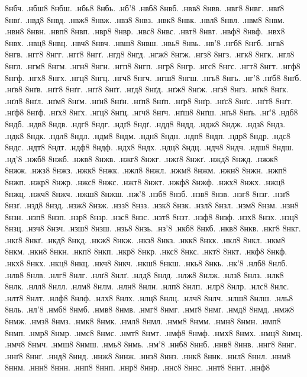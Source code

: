{8нбч.
.нбш8
8нбш.
.нбь8
8нбь.
.нб'8
.нвб8
8нвб.
.нвв8
8нвв.
.нвг8
8нвг.
.нвґ8
8нвґ.
.нвд8
8нвд.
.нвж8
8нвж.
.нвз8
8нвз.
.нвк8
8нвк.
.нвл8
8нвл.
.нвм8
8нвм.
.нвн8
8нвн.
.нвп8
8нвп.
.нвр8
8нвр.
.нвс8
8нвс.
.нвт8
8нвт.
.нвф8
8нвф.
.нвх8
8нвх.
.нвц8
8нвц.
.нвч8
8нвч.
.нвш8
8нвш.
.нвь8
8нвь.
.нв'8
.нгб8
8нгб.
.нгв8
8нгв.
.нгг8
8нгг.
.нгґ8
8нгґ.
.нгд8
8нгд.
.нгж8
8нгж.
.нгз8
8нгз.
.нгк8
8нгк.
.нгл8
8нгл.
.нгм8
8нгм.
.нгн8
8нгн.
.нгп8
8нгп.
.нгр8
8нгр.
.нгс8
8нгс.
.нгт8
8нгт.
.нгф8
8нгф.
.нгх8
8нгх.
.нгц8
8нгц.
.нгч8
8нгч.
.нгш8
8нгш.
.нгь8
8нгь.
.нг'8
.нґб8
8нґб.
.нґв8
8нґв.
.нґг8
8нґг.
.нґґ8
8нґґ.
.нґд8
8нґд.
.нґж8
8нґж.
.нґз8
8нґз.
.нґк8
8нґк.
.нґл8
8нґл.
.нґм8
8нґм.
.нґн8
8нґн.
.нґп8
8нґп.
.нґр8
8нґр.
.нґс8
8нґс.
.нґт8
8нґт.
.нґф8
8нґф.
.нґх8
8нґх.
.нґц8
8нґц.
.нґч8
8нґч.
.нґш8
8нґш.
.нґь8
8нґь.
.нґ'8
.ндб8
8ндб.
.ндв8
8ндв.
.ндг8
8ндг.
.ндґ8
8ндґ.
.ндд8
8ндд.
.ндж8
8ндж.
.ндз8
8ндз.
.ндк8
8ндк.
.ндл8
8ндл.
.ндм8
8ндм.
.ндн8
8ндн.
.ндп8
8ндп.
.ндр8
8ндр.
.ндс8
8ндс.
.ндт8
8ндт.
.ндф8
8ндф.
.ндх8
8ндх.
.ндц8
8ндц.
.ндч8
8ндч.
.ндш8
8ндш.
.нд'8
.нжб8
8нжб.
.нжв8
8нжв.
.нжг8
8нжг.
.нжґ8
8нжґ.
.нжд8
8нжд.
.нжж8
8нжж.
.нжз8
8нжз.
.нжк8
8нжк.
.нжл8
8нжл.
.нжм8
8нжм.
.нжн8
8нжн.
.нжп8
8нжп.
.нжр8
8нжр.
.нжс8
8нжс.
.нжт8
8нжт.
.нжф8
8нжф.
.нжх8
8нжх.
.нжц8
8нжц.
.нжч8
8нжч.
.нжш8
8нжш.
.нж'8
.нзб8
8нзб.
.нзв8
8нзв.
.нзг8
8нзг.
.нзґ8
8нзґ.
.нзд8
8нзд.
.нзж8
8нзж.
.нзз8
8нзз.
.нзк8
8нзк.
.нзл8
8нзл.
.нзм8
8нзм.
.нзн8
8нзн.
.нзп8
8нзп.
.нзр8
8нзр.
.нзс8
8нзс.
.нзт8
8нзт.
.нзф8
8нзф.
.нзх8
8нзх.
.нзц8
8нзц.
.нзч8
8нзч.
.нзш8
8нзш.
.нзь8
8нзь.
.нз'8
.нкб8
8нкб.
.нкв8
8нкв.
.нкг8
8нкг.
.нкґ8
8нкґ.
.нкд8
8нкд.
.нкж8
8нкж.
.нкз8
8нкз.
.нкк8
8нкк.
.нкл8
8нкл.
.нкм8
8нкм.
.нкн8
8нкн.
.нкп8
8нкп.
.нкр8
8нкр.
.нкс8
8нкс.
.нкт8
8нкт.
.нкф8
8нкф.
.нкх8
8нкх.
.нкц8
8нкц.
.нкч8
8нкч.
.нкш8
8нкш.
.нкь8
8нкь.
.нк'8
.нлб8
8нлб.
.нлв8
8нлв.
.нлг8
8нлг.
.нлґ8
8нлґ.
.нлд8
8нлд.
.нлж8
8нлж.
.нлз8
8нлз.
.нлк8
8нлк.
.нлл8
8нлл.
.нлм8
8нлм.
.нлн8
8нлн.
.нлп8
8нлп.
.нлр8
8нлр.
.нлс8
8нлс.
.нлт8
8нлт.
.нлф8
8нлф.
.нлх8
8нлх.
.нлц8
8нлц.
.нлч8
8нлч.
.нлш8
8нлш.
.нль8
8нль.
.нл'8
.нмб8
8нмб.
.нмв8
8нмв.
.нмг8
8нмг.
.нмґ8
8нмґ.
.нмд8
8нмд.
.нмж8
8нмж.
.нмз8
8нмз.
.нмк8
8нмк.
.нмл8
8нмл.
.нмм8
8нмм.
.нмн8
8нмн.
.нмп8
8нмп.
.нмр8
8нмр.
.нмс8
8нмс.
.нмт8
8нмт.
.нмф8
8нмф.
.нмх8
8нмх.
.нмц8
8нмц.
.нмч8
8нмч.
.нмш8
8нмш.
.нмь8
8нмь.
.нм'8
.ннб8
8ннб.
.ннв8
8ннв.
.ннг8
8ннг.
.ннґ8
8ннґ.
.ннд8
8ннд.
.ннж8
8ннж.
.ннз8
8ннз.
.ннк8
8ннк.
.ннл8
8ннл.
.ннм8
8ннм.
.ннн8
8ннн.
.ннп8
8ннп.
.ннр8
8ннр.
.ннс8
8ннс.
.ннт8
8ннт.
.ннф8
}
